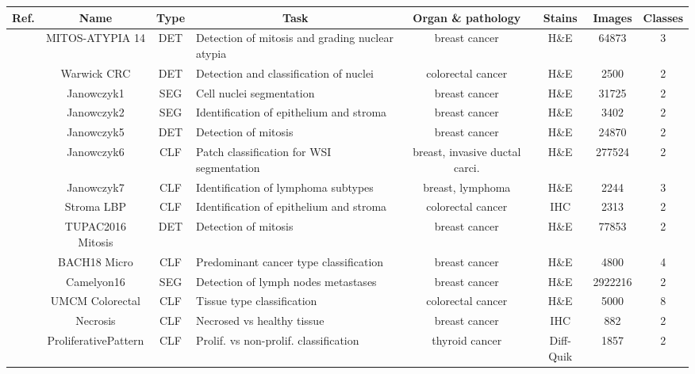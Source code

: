 \begin{table}[t]
    \centering
    \tiny
    \begin{tabular}{|r|c|c|l|c|c|c|c|}
        \hline
        Ref. & \textbf{Name} & Type & \multicolumn{1}{c|}{Task} & Organ \& pathology & Stains & Images & Classes \\
        \hline
\cite{roux2014mitos} & MITOS-ATYPIA 14 & DET & Detection of mitosis and grading nuclear atypia & breast cancer & H\&E & 64873 & 3 \\
\cite{sirinukunwattana2016locality} & Warwick CRC & DET & Detection and classification of nuclei & colorectal cancer & H\&E & 2500 & 2 \\
\cite{janowczyk2016deep} & Janowczyk1 & SEG & Cell nuclei segmentation & breast cancer & H\&E & 31725 & 2 \\
\cite{janowczyk2016deep} & Janowczyk2 & SEG & Identification of epithelium and stroma & breast cancer & H\&E & 3402 & 2 \\
\cite{janowczyk2016deep} & Janowczyk5 & DET & Detection of mitosis & breast cancer & H\&E & 24870 & 2 \\
\cite{janowczyk2016deep} & Janowczyk6 & CLF & Patch classification for WSI segmentation & breast, invasive ductal carci. & H\&E & 277524 & 2 \\
\cite{janowczyk2016deep} & Janowczyk7 & CLF & Identification of lymphoma subtypes & breast, lymphoma & H\&E & 2244 & 3 \\
\cite{linder2012identification} & Stroma LBP & CLF & Identification of epithelium and stroma & colorectal cancer & IHC & 2313 & 2 \\
\cite{veta2019predicting} & TUPAC2016 Mitosis & DET & Detection of mitosis & breast cancer & H\&E & 77853 & 2 \\
\cite{aresta2019bach} & BACH18 Micro & CLF & Predominant cancer type classification & breast cancer & H\&E & 4800 & 4 \\ 
\cite{bejnordi2017diagnostic} & Camelyon16 & SEG & Detection of lymph nodes metastases & breast cancer & H\&E & 2922216 & 2 \\
\cite{kather2016multi} & UMCM Colorectal & CLF & Tissue type classification & colorectal cancer & H\&E& 5000 & 8 \\
\cite{mormont2018comparison} & Necrosis & CLF & Necrosed vs healthy tissue & breast cancer & IHC & 882 & 2 \\
\cite{mormont2018comparison} & ProliferativePattern & CLF & Prolif. vs non-prolif. classification & thyroid cancer & Diff-Quik & 1857 & 2 \\

\end{tabular}
\end{table}
